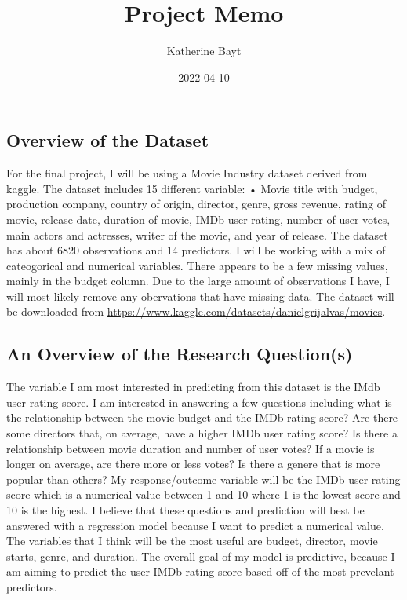 \documentclass[
]{article}
\title{Project Memo}
\author{Katherine Bayt}
\date{2022-04-10}
\begin{document}
\maketitle

\hypertarget{overview-of-the-dataset}{%
\subsection{Overview of the Dataset}\label{overview-of-the-dataset}}

For the final project, I will be using a Movie Industry dataset derived
from kaggle. The dataset includes 15 different variable: • Movie title
with budget, production company, country of origin, director, genre,
gross revenue, rating of movie, release date, duration of movie, IMDb
user rating, number of user votes, main actors and actresses, writer of
the movie, and year of release. The dataset has about 6820 observations
and 14 predictors. I will be working with a mix of cateogorical and
numerical variables. There appears to be a few missing values, mainly in
the budget column. Due to the large amount of observations I have, I
will most likely remove any obervations that have missing data. The
dataset will be downloaded from
\url{https://www.kaggle.com/datasets/danielgrijalvas/movies}.

\hypertarget{an-overview-of-the-research-questions}{%
\subsection{An Overview of the Research
Question(s)}\label{an-overview-of-the-research-questions}}

The variable I am most interested in predicting from this dataset is the
IMdb user rating score. I am interested in answering a few questions
including what is the relationship between the movie budget and the IMDb
rating score? Are there some directors that, on average, have a higher
IMDb user rating score? Is there a relationship between movie duration
and number of user votes? If a movie is longer on average, are there
more or less votes? Is there a genere that is more popular than others?
My response/outcome variable will be the IMDb user rating score which is
a numerical value between 1 and 10 where 1 is the lowest score and 10 is
the highest. I believe that these questions and prediction will best be
answered with a regression model because I want to predict a numerical
value. The variables that I think will be the most useful are budget,
director, movie starts, genre, and duration. The overall goal of my
model is predictive, because I am aiming to predict the user IMDb rating
score based off of the most prevelant predictors.
\end{document}
